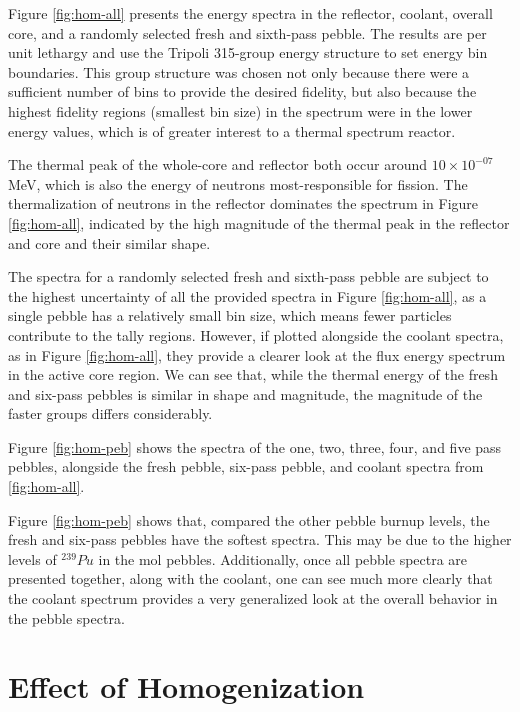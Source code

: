 Figure \ref{fig:hom-all} presents the energy spectra in the reflector, coolant, overall core, and a randomly selected fresh and sixth-pass pebble.  The results are per unit lethargy and use the Tripoli 315-group energy structure \cite{brun_tripoli-4_2015} to set energy bin boundaries.  This group structure was chosen not only because there were a sufficient number of bins to provide the desired fidelity, but also because the highest fidelity regions (smallest bin size) in the spectrum were in the lower energy values, which is of greater interest to a thermal spectrum reactor.



The thermal peak of the whole-core and reflector both occur around $10\times10^{-07}$ MeV, which is also the energy of neutrons most-responsible for fission.  The thermalization of neutrons in the reflector dominates the spectrum in Figure \ref{fig:hom-all}, indicated by the high magnitude of the thermal peak in the reflector and core and their similar shape.

The spectra for a randomly selected fresh and sixth-pass pebble are subject to the highest uncertainty of all the provided spectra in Figure \ref{fig:hom-all}, as a single pebble has a relatively small bin size, which means fewer particles contribute to the tally regions.  However, if plotted alongside the coolant spectra, as in Figure \ref{fig:hom-all}, they provide a clearer look at the flux energy spectrum in the active core region.  We can see that, while the thermal energy of the fresh and six-pass pebbles is similar in shape and magnitude, the magnitude of the faster groups differs considerably.

Figure \ref{fig:hom-peb} shows the spectra of the one, two, three, four, and five pass pebbles, alongside the fresh pebble, six-pass pebble, and coolant spectra from \ref{fig:hom-all}. 



Figure \ref{fig:hom-peb} shows that, compared the other pebble burnup levels, the fresh and six-pass pebbles have the softest spectra.  This may be due to the higher levels of $^{239}Pu$ in the \acrshort{mol} pebbles. Additionally, once all pebble spectra are presented together, along with the coolant, one can see much more clearly that the coolant spectrum provides a very generalized look at the overall behavior in the pebble spectra.


\section{Effect of Homogenization}
\label{res-hom}

